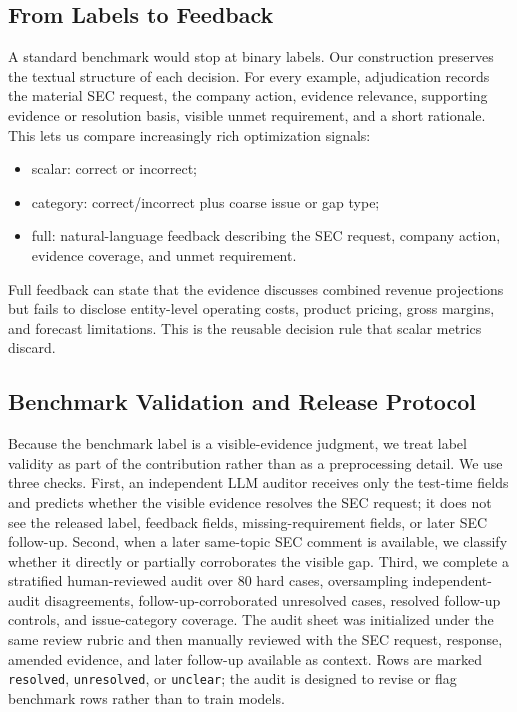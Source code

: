 \documentclass[11pt]{article}
\begin{document}
\subsection{From Labels to Feedback}

A standard benchmark would stop at binary labels. Our construction preserves the textual structure of each decision. For every example, adjudication records the material SEC request, the company action, evidence relevance, supporting evidence or resolution basis, visible unmet requirement, and a short rationale. This lets us compare increasingly rich optimization signals:
\begin{itemize}[leftmargin=*]
    \item scalar: correct or incorrect;
    \item category: correct/incorrect plus coarse issue or gap type;
    \item full: natural-language feedback describing the SEC request, company action, evidence coverage, and unmet requirement.
\end{itemize}
Full feedback can state that the evidence discusses combined revenue projections but fails to disclose entity-level operating costs, product pricing, gross margins, and forecast limitations. This is the reusable decision rule that scalar metrics discard.

\subsection{Benchmark Validation and Release Protocol}

Because the benchmark label is a visible-evidence judgment, we treat label validity as part of the contribution rather than as a preprocessing detail. We use three checks. First, an independent LLM auditor receives only the test-time fields and predicts whether the visible evidence resolves the SEC request; it does not see the released label, feedback fields, missing-requirement fields, or later SEC follow-up. Second, when a later same-topic SEC comment is available, we classify whether it directly or partially corroborates the visible gap. Third, we complete a stratified human-reviewed audit over 80 hard cases, oversampling independent-audit disagreements, follow-up-corroborated unresolved cases, resolved follow-up controls, and issue-category coverage. The audit sheet was initialized under the same review rubric and then manually reviewed with the SEC request, response, amended evidence, and later follow-up available as context. Rows are marked \texttt{resolved}, \texttt{unresolved}, or \texttt{unclear}; the audit is designed to revise or flag benchmark rows rather than to train models.
\end{document}
